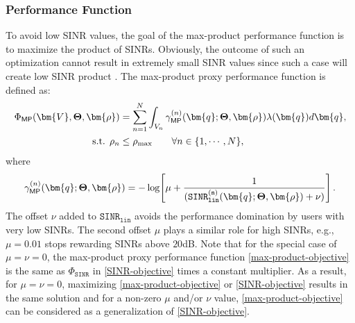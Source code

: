 \subsubsection{Performance Function}\label{MP-Objective}
To avoid low SINR values, the goal of the max-product performance function is to maximize the product of SINRs. Obviously, the outcome of such an optimization cannot result in extremely small SINR values since such a case will create low SINR product \cite{nikbakht2020unsupervised}. 
The max-product proxy performance function is defined as:
\begin{align}\label{max-product-objective}
    \Phi_{{\sf MP}}(\bm{V}, \mathbf{\Theta}, \bm{\rho}) &=  \sum_{n=1}^{N} \int_{V_n} \gamma^{(n)}_{{\sf MP}} (\bm{q}; \mathbf{\Theta}, \bm{\rho}) \lambda(\bm{q}) d\bm{q}, \\
    \textrm{s.t. } \rho_n &\leq \rho_{\max} \qquad \forall n \in \{1,\cdots, N\}, \label{max-product-objective-constraint}
\end{align}
where
\begin{align}\label{Max-product}
\gamma_{\sf MP}^{(n)}(\bm{q}; \mathbf{\Theta}, \bm{\rho}) = - \log \! \left[ \mu + \frac{1}{(\mathtt{SINR^{(n)}_{lin}}(\bm{q}; \mathbf{\Theta}, \bm{\rho}) + \nu )} \right].
\end{align}
The offset $\nu$ added to $\mathtt{SINR_{lin}}$ avoids the performance domination by users with very low SINRs. The second offset $\mu$ plays a similar role for high SINRs, e.g., $\mu=0.01$ stops rewarding SINRs above $20$dB. Note that for the special case of $\mu = \nu = 0$, the max-product proxy performance function \eqref{max-product-objective} is the same as  $\Phi_{\mathtt{SINR}}$ in \eqref{SINR-objective} times a constant multiplier. As a result, for $\mu = \nu = 0$, maximizing  \eqref{max-product-objective} or \eqref{SINR-objective} results in the same solution and for a non-zero $\mu$ and/or $\nu$ value, \eqref{max-product-objective} can be considered as a generalization of \eqref{SINR-objective}.




